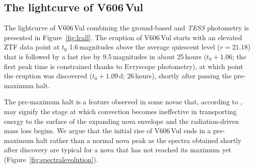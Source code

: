 \documentclass[twocolumn]{aastex631}
\newcommand{\nova}{V606\,Vul}
\begin{document}
\subsection{The lightcurve of \nova{}}
\label{sec:lightcurveshape}


The lightcurve of \nova{} combining the ground-based and {\em TESS} photometry is presented in Figure~\ref{fig:lcall}.
The eruption of \nova{} starts with an elevated ZTF data point at $t_0$ 
1.6\,magnitudes above the average quiescent level ($r=21.18$) that is followed by a fast rise 
by 9.5\,magnitudes in  
about 25\,hours 
($t_0 + 1.06$; the first peak time is constrained thanks 
to Evryscope photometry), %
at which point the eruption was discovered 
($t_0+1.09$\,d; 26\,hours), shortly after passing the pre-maximum halt.

The pre-maximum halt is a feature observed in some novae that, 
according to \cite{2014MNRAS.437.1962H}, may signify the stage at which
convection becomes ineffective in transporting energy to the surface of the
expanding nova envelope and the radiation-driven mass loss begins.
We argue that the initial rise of \nova{} ends in a pre-maximum halt rather
than a normal nova peak as the spectra obtained shortly after discovery are
typical for a nova that has not reached its maximum yet (Figure~\ref{fig:spectralevolution}).
 
\end{document}
